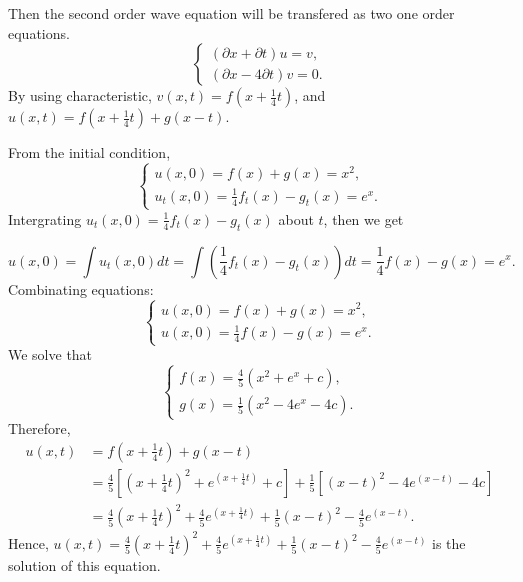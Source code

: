\documentclass[12pt]{article}%
\begin{document}
\begin{enumerate}
\begin{enumerate}
        Then the second order wave equation will be transfered as two one order equations.
        \begin{equation*}
            \begin{cases}
                (\partial x + \partial t) u=v,
                \\
                (\partial x -4\partial t)v=0.
            \end{cases}
        \end{equation*}
        By using characteristic, $v(x,t)=f(x+\frac{1}{4}t)$, and $u(x,t)=f(x+\frac{1}{4}t)+g(x-t).$ 
        
        From the initial condition, 
        \begin{equation*}
            \begin{cases}
                u(x,0)=f(x)+g(x)=x^2,
                \\
                u_{t}(x,0)=\frac{1}{4}f_{t}(x)-g_{t}(x)=e^x.  
            \end{cases}
        \end{equation*}
        Intergrating $ u_{t}(x,0)=\frac{1}{4}f_{t}(x)-g_{t}(x)$ about $t$, then we get

        \[u(x,0)=\int u_{t}(x,0) dt =\int (\frac{1}{4}f_{t}(x)-g_{t}(x))dt=\frac{1}{4}f(x)-g(x)=e^x.\]
        Combinating equations:
        \begin{equation*}
            \begin{cases}
                u(x,0)=f(x)+g(x)=x^2,
                \\
                u(x,0)=\frac{1}{4}f(x)-g(x)=e^x.
            \end{cases}
        \end{equation*}
        We solve that 
        \begin{equation*}
            \begin{cases}
                f(x)=\frac{4}{5}(x^2+e^x+c),
                \\
                g(x)=\frac{1}{5}(x^2-4e^x-4c).
            \end{cases}
        \end{equation*}
        Therefore,
        \begin{align*}
            u(x,t)&=f(x+\frac{1}{4}t)+g(x-t)\\
            &=\frac{4}{5}[(x+\frac{1}{4}t)^2+e^{(x+\frac{1}{4}t)}+c] + \frac{1}{5}[(x-t)^2-4e^{(x-t)}-4c]\\
            &=\frac{4}{5}(x+\frac{1}{4}t)^2+\frac{4}{5}e^{(x+\frac{1}{4}t)}+\frac{1}{5}(x-t)^2- \frac{4}{5}e^{(x-t)}.
        \end{align*}
        Hence, $u(x,t)=\frac{4}{5}(x+\frac{1}{4}t)^2+\frac{4}{5}e^{(x+\frac{1}{4}t)}+\frac{1}{5}(x-t)^2- \frac{4}{5}e^{(x-t)}$ is the solution of this equation.
         \end{enumerate}


\end{enumerate}
\end{document}
